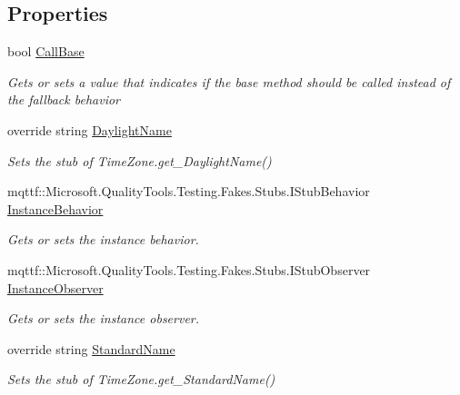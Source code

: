 \subsection*{Properties}
\begin{DoxyCompactItemize}
\item 
bool \hyperlink{class_system_1_1_fakes_1_1_stub_time_zone_a6eba19bfccfa5007396bdffbac60fda4}{Call\-Base}
\begin{DoxyCompactList}\small\item\em Gets or sets a value that indicates if the base method should be called instead of the fallback behavior\end{DoxyCompactList}\item 
override string \hyperlink{class_system_1_1_fakes_1_1_stub_time_zone_a7df0c8f8b48c3a97ae8fb6db56e2d143}{Daylight\-Name}
\begin{DoxyCompactList}\small\item\em Sets the stub of Time\-Zone.\-get\-\_\-\-Daylight\-Name()\end{DoxyCompactList}\item 
mqttf\-::\-Microsoft.\-Quality\-Tools.\-Testing.\-Fakes.\-Stubs.\-I\-Stub\-Behavior \hyperlink{class_system_1_1_fakes_1_1_stub_time_zone_a4bc9f4095f51ce7432a38120f652a789}{Instance\-Behavior}
\begin{DoxyCompactList}\small\item\em Gets or sets the instance behavior.\end{DoxyCompactList}\item 
mqttf\-::\-Microsoft.\-Quality\-Tools.\-Testing.\-Fakes.\-Stubs.\-I\-Stub\-Observer \hyperlink{class_system_1_1_fakes_1_1_stub_time_zone_a4caca0956e2d413d683526a32f233a9b}{Instance\-Observer}
\begin{DoxyCompactList}\small\item\em Gets or sets the instance observer.\end{DoxyCompactList}\item 
override string \hyperlink{class_system_1_1_fakes_1_1_stub_time_zone_af3982f7703ce5d7650a9550c55bc21c0}{Standard\-Name}
\begin{DoxyCompactList}\small\item\em Sets the stub of Time\-Zone.\-get\-\_\-\-Standard\-Name()\end{DoxyCompactList}\end{DoxyCompactItemize}


